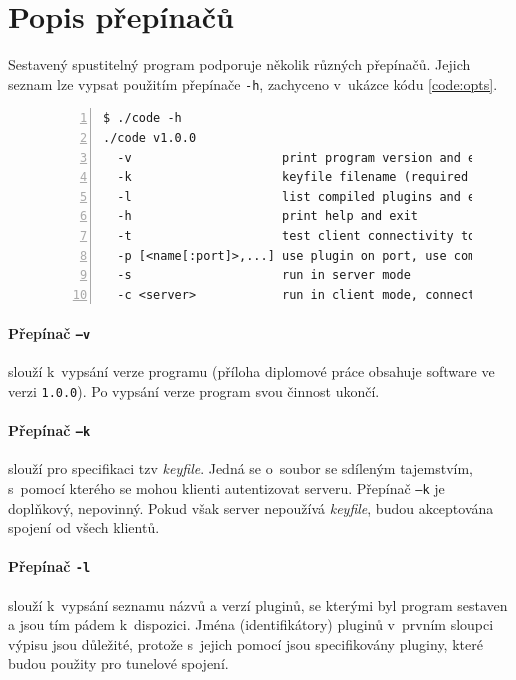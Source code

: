\documentclass[thesis=M,czech]{FITthesis}[2012/10/20]
\begin{document}
    \section{Popis přepínačů}
    
    Sestavený spustitelný program podporuje několik různých přepínačů. Jejich seznam lze vypsat použitím přepínače \texttt{-h}, zachyceno v~ukázce kódu \ref{code:opts}.
    
    \begin{figure}[t]
	\begin{lstlisting}[label=code:opts,caption=Výpis podporovaných přepínačů aplikace,frame=single,numbers=left]
$ ./code -h
./code v1.0.0
  -v                     print program version and exit
  -k                     keyfile filename (required for auth)
  -l                     list compiled plugins and exit
  -h                     print help and exit
  -t                     test client connectivity to server and exit
  -p [<name[:port]>,...] use plugin on port, use comma to specify more plugins
  -s                     run in server mode
  -c <server>            run in client mode, connect to server ip/hostname
      \end{lstlisting}
    \end{figure}

    
    \paragraph{Přepínač \texttt{--v}} slouží k~vypsání verze programu (příloha diplomové práce obsahuje software ve verzi \texttt{1.0.0}). Po vypsání verze program svou činnost ukončí.
    
    \paragraph{Přepínač \texttt{--k}} slouží pro specifikaci tzv \textit{keyfile}. Jedná se o~soubor se sdíleným tajemstvím, s~pomocí kterého se mohou klienti autentizovat serveru. Přepínač \texttt{--k} je doplňkový, nepovinný. Pokud však server nepoužívá \textit{keyfile}, budou akceptována spojení od všech klientů.
    
    \paragraph{Přepínač \texttt{-l}} slouží k~vypsání seznamu názvů a verzí pluginů, se kterými byl program sestaven a jsou tím pádem k~dispozici. Jména (identifikátory) pluginů v~prvním sloupci výpisu jsou důležité, protože s~jejich pomocí jsou specifikovány pluginy, které budou použity pro tunelové spojení.
\end{document}
